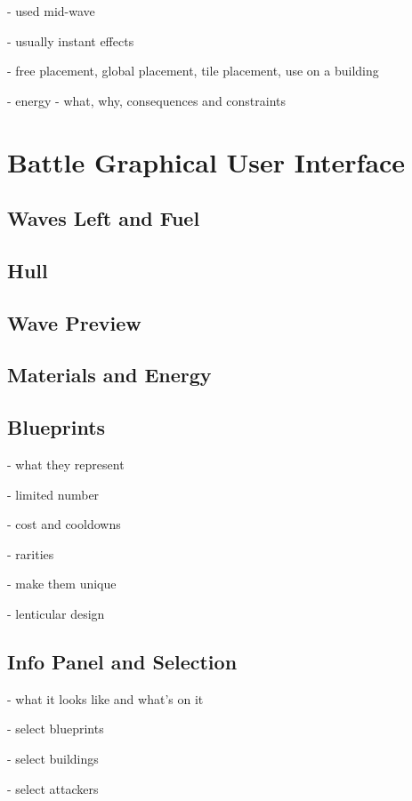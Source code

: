 - used mid-wave

- usually instant effects

- free placement, global placement, tile placement, use on a building

- energy - what, why, consequences and constraints


\section{Battle Graphical User Interface}


\subsection{Waves Left and Fuel}

\subsection{Hull}

\subsection{Wave Preview}

\subsection{Materials and Energy}

\subsection{Blueprints}

- what they represent

- limited number

- cost and cooldowns

- rarities

- make them unique

- lenticular design

\subsection{Info Panel and Selection}

- what it looks like and what's on it

- select blueprints

- select buildings

- select attackers

